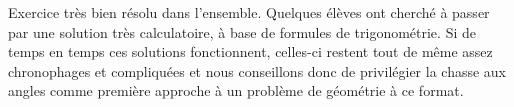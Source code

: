 Exercice très bien résolu dans l'ensemble.
Quelques élèves ont cherché à passer par une solution très calculatoire, à base de formules de trigonométrie. Si de temps en temps ces solutions fonctionnent, celles-ci restent tout de même assez chronophages et compliquées et nous conseillons donc de privilégier la chasse aux angles comme première approche à un problème de géométrie à ce format.